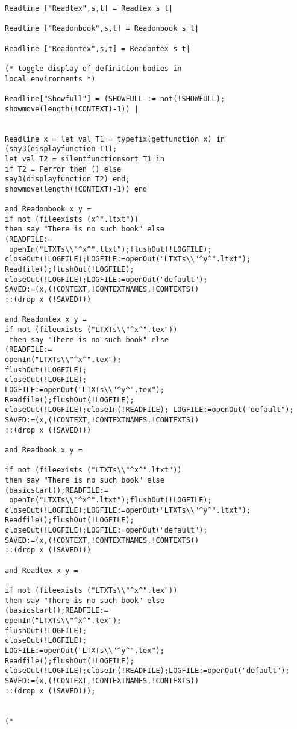 \documentclass[12pt]{article}
\begin{document}
\begin{verbatim}
Readline ["Readtex",s,t] = Readtex s t|

Readline ["Readonbook",s,t] = Readonbook s t|

Readline ["Readontex",s,t] = Readontex s t|

(* toggle display of definition bodies in
local environments *)

Readline["Showfull"] = (SHOWFULL := not(!SHOWFULL);
showmove(length(!CONTEXT)-1)) |


Readline x = let val T1 = typefix(getfunction x) in
(say3(displayfunction T1);
let val T2 = silentfunctionsort T1 in
if T2 = Ferror then () else
say3(displayfunction T2) end;
showmove(length(!CONTEXT)-1)) end 

and Readonbook x y = 
if not (fileexists (x^".ltxt")) 
then say "There is no such book" else
(READFILE:=
 openIn("LTXTs\\"^x^".ltxt");flushOut(!LOGFILE);
closeOut(!LOGFILE);LOGFILE:=openOut("LTXTs\\"^y^".ltxt");
Readfile();flushOut(!LOGFILE);
closeOut(!LOGFILE);LOGFILE:=openOut("default");
SAVED:=(x,(!CONTEXT,!CONTEXTNAMES,!CONTEXTS))
::(drop x (!SAVED)))

and Readontex x y = 
if not (fileexists ("LTXTs\\"^x^".tex"))
 then say "There is no such book" else
(READFILE:= 
openIn("LTXTs\\"^x^".tex");
flushOut(!LOGFILE);
closeOut(!LOGFILE);
LOGFILE:=openOut("LTXTs\\"^y^".tex");
Readfile();flushOut(!LOGFILE);
closeOut(!LOGFILE);closeIn(!READFILE); LOGFILE:=openOut("default");
SAVED:=(x,(!CONTEXT,!CONTEXTNAMES,!CONTEXTS))
::(drop x (!SAVED)))

and Readbook x y = 

if not (fileexists ("LTXTs\\"^x^".ltxt")) 
then say "There is no such book" else
(basicstart();READFILE:=
 openIn("LTXTs\\"^x^".ltxt");flushOut(!LOGFILE);
closeOut(!LOGFILE);LOGFILE:=openOut("LTXTs\\"^y^".ltxt");
Readfile();flushOut(!LOGFILE);
closeOut(!LOGFILE);LOGFILE:=openOut("default");
SAVED:=(x,(!CONTEXT,!CONTEXTNAMES,!CONTEXTS))
::(drop x (!SAVED)))

and Readtex x y = 

if not (fileexists ("LTXTs\\"^x^".tex")) 
then say "There is no such book" else
(basicstart();READFILE:= 
openIn("LTXTs\\"^x^".tex");
flushOut(!LOGFILE);
closeOut(!LOGFILE);
LOGFILE:=openOut("LTXTs\\"^y^".tex");
Readfile();flushOut(!LOGFILE);
closeOut(!LOGFILE);closeIn(!READFILE);LOGFILE:=openOut("default");
SAVED:=(x,(!CONTEXT,!CONTEXTNAMES,!CONTEXTS))
::(drop x (!SAVED)));


(*

\end{verbatim}
\end{document}
